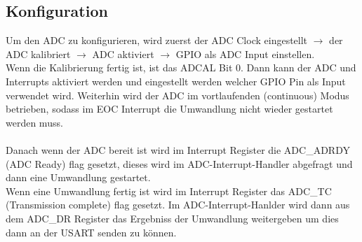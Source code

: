         
        
    
    \subsection{Konfiguration}
        Um den ADC zu konfigurieren, wird zuerst der ADC Clock eingestellt $\rightarrow$ der ADC kalibriert $\rightarrow$  
        ADC aktiviert $\rightarrow$  GPIO als ADC Input einstellen.\\
        Wenn die Kalibrierung fertig ist, ist das ADCAL Bit 0. Dann kann der ADC und Interrupts aktiviert werden und eingestellt werden 
        welcher GPIO Pin als Input verwendet wird. Weiterhin wird der ADC im vortlaufenden (continuous) Modus betrieben, sodass im EOC Interrupt die Umwandlung nicht 
        wieder gestartet werden muss. \\\\
        
        \noindent Danach wenn der ADC bereit ist wird im Interrupt Register die ADC\_ADRDY (ADC Ready) flag gesetzt, dieses wird im ADC-Interrupt-Handler abgefragt und dann
        eine Umwandlung gestartet.\\ 
        Wenn eine Umwandlung fertig ist wird im Interrupt Register das ADC\_TC (Transmission complete) flag gesetzt. Im ADC-Interrupt-Hanlder wird dann aus dem ADC\_DR Register
        das Ergebniss der Umwandlung weitergeben um dies dann an der USART senden zu können.
    
\newpage
